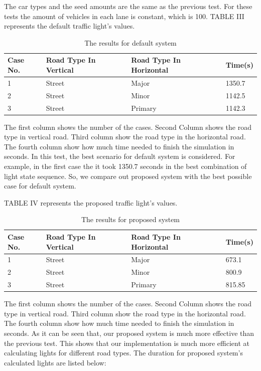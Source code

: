 \documentclass[conference]{IEEEtran}
\begin{document}
\par The car types and the seed amounts are the same as the previous test. For these tests the amount of vehicles in each lane is constant, which is 100. TABLE III represents the default traffic light's values.

\begin{table}[h!]
	\centering
	\begin{tabular}{||p{0.5cm} p{2cm} p{2cm} p{1cm}||} 
		\hline
		\textbf{Case No.} & \textbf{Road Type In Vertical} & \textbf{Road Type In Horizontal} & \textbf{Time(s)} \\ [0.5ex] 
		\hline\hline
		1        & Street                     & Major                      & 1350.7  \\ 
		\hline
		2        & Street                     & Minor                      & 1142.5  \\
		\hline
		3        & Street                     & Primary                      & 1142.3 \\
		\hline
	\end{tabular}
	\newline
    \caption{The results for default system}
    \label{fig:my_label}
\end{table}
	The first column shows the number of the cases. Second Column shows the road type in vertical road. Third column show the road type in the horizontal road. The fourth column show how much time needed to finish the simulation in seconds.    
    In this test, the best scenario for default system is considered. For example, in the first case the it took 1350.7 seconds in the best combination of light state sequence. So, we compare out proposed system with the best possible case for default system.
   \par TABLE IV represents the proposed traffic light's values.
    \begin{table}[h!]
	\centering
	\begin{tabular}{||p{0.5cm} p{2cm} p{2cm} p{1cm}||} 
		\hline
		\textbf{Case No.} & \textbf{Road Type In Vertical} & \textbf{Road Type In Horizontal} & \textbf{Time(s)} \\ [0.1ex] 
		\hline\hline
		1        & Street                     & Major                      & 673.1  \\ 
		\hline
		2        & Street                     & Minor                      & 800.9  \\
		\hline
		3        & Street                     & Primary                      & 815.85 \\
		\hline
	\end{tabular}
    	\newline
    	\caption{The results for proposed system}
    	\label{fig:my_label}	
\end{table}
	The first column shows the number of the cases. Second Column shows the road type in vertical road. Third column show the road type in the horizontal road. The fourth column show how much time needed to finish the simulation in seconds.
    As it can be seen that, our proposed system is much more effective than the previous test. This shows that our implementation is much more efficient at calculating lights for different road types. The duration for proposed system's calculated lights are listed below:
    
\end{document}
